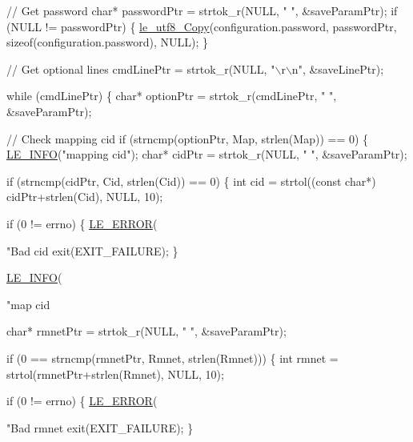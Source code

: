 \begin{DoxyCodeInclude}
{        \textcolor{comment}{// Get password}
        \textcolor{keywordtype}{char}* passwordPtr = strtok\_r(NULL, \textcolor{stringliteral}{" "}, &saveParamPtr);
        \textcolor{keywordflow}{if} (NULL != passwordPtr)
        \{
            \hyperlink{le__utf8_8h_aa5ae72c01396c106fdf3b4741ead7477}{le\_utf8\_Copy}(configuration.password, passwordPtr, \textcolor{keyword}{sizeof}(configuration.password), 
      NULL);
        \}

        \textcolor{comment}{// Get optional lines}
        cmdLinePtr = strtok\_r(NULL, \textcolor{stringliteral}{"\(\backslash\)r\(\backslash\)n"}, &saveLinePtr);

        \textcolor{keywordflow}{while} (cmdLinePtr)
        \{
            \textcolor{keywordtype}{char}* optionPtr = strtok\_r(cmdLinePtr, \textcolor{stringliteral}{" "}, &saveParamPtr);

            \textcolor{comment}{// Check mapping cid}
            \textcolor{keywordflow}{if} (strncmp(optionPtr, Map, strlen(Map)) == 0)
            \{
                \hyperlink{le__log_8h_a23e6d206faa64f612045d688cdde5808}{LE\_INFO}(\textcolor{stringliteral}{"mapping cid"});
                \textcolor{keywordtype}{char}* cidPtr = strtok\_r(NULL, \textcolor{stringliteral}{" "}, &saveParamPtr);

                \textcolor{keywordflow}{if} (strncmp(cidPtr, Cid, strlen(Cid)) == 0)
                \{
                    \textcolor{keywordtype}{int} cid = strtol((\textcolor{keyword}{const} \textcolor{keywordtype}{char}*) cidPtr+strlen(Cid), NULL, 10);

                    \textcolor{keywordflow}{if} (0 != errno)
                    \{
                        \hyperlink{le__log_8h_a353590f91b3143a7ba3a416ae5a50c3d}{LE\_ERROR}(\textcolor{stringliteral}{"Bad cid %
                        exit(EXIT\_FAILURE);
                    \}

                    \hyperlink{le__log_8h_a23e6d206faa64f612045d688cdde5808}{LE\_INFO}(\textcolor{stringliteral}{"map cid %

                    \textcolor{keywordtype}{char}* rmnetPtr = strtok\_r(NULL, \textcolor{stringliteral}{" "}, &saveParamPtr);

                    \textcolor{keywordflow}{if} (0 == strncmp(rmnetPtr, Rmnet, strlen(Rmnet)))
                    \{
                        \textcolor{keywordtype}{int} rmnet = strtol(rmnetPtr+strlen(Rmnet), NULL, 10);

                        \textcolor{keywordflow}{if} (0 != errno)
                        \{
                            \hyperlink{le__log_8h_a353590f91b3143a7ba3a416ae5a50c3d}{LE\_ERROR}(\textcolor{stringliteral}{"Bad rmnet %
                            exit(EXIT\_FAILURE);
                        \}

}}}}
\end{DoxyCodeInclude}

